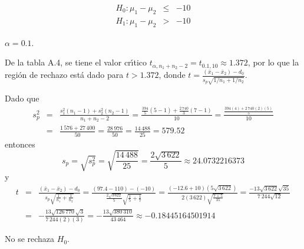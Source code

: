 \begin{solucion}
 \begin{hipotesis}
  \begin{eqnarray*}
   H_0: \mu_1 - \mu_2 & \leq & -10 \\
   H_1: \mu_1 - \mu_2 &   >  & -10
  \end{eqnarray*}
 \end{hipotesis}

 \begin{significancia}
  $\alpha = 0.1$.
 \end{significancia}

 \begin{region}
  De la tabla A.4, se tiene el valor cr\'{\i}tico
  $t_{\alpha, n_1+n_2-2} = t_{0.1,10} \approx 1.372$,
  por lo que la regi\'on de rechazo est\'a dado para $t > 1.372$,
  donde $t =
  \frac{
  \left( \bar{x}_1 - \bar{x}_2 \right) - d_0
  }{
  s_p\sqrt{1/n_1 + 1/n_2}
  }$.
 \end{region}

 \begin{estadistico}
  Dado que
  \begin{eqnarray*}
   s_p^2 & = & \frac{
   s_1^2 \left( n_1 - 1 \right) + s_2^2 \left( n_2 - 1\right)
   }{
   n_1 + n_2 -2
   }
   = \frac{\frac{394}{5}(5-1) + \frac{2\,740}{3}(7-1)}{10}
   = \frac{\frac{394(4) + 2\,740(2)(5)}{5}}{10} \\
   & = & \frac{1\,576 + 27\,400}{50} = \frac{28\,976}{50}
   = \frac{14\,488}{25} = 579.52
  \end{eqnarray*}
  entonces
  \begin{equation*}
   s_p = \sqrt{s_p^2} = \sqrt{\frac{14\,488}{25}}
   = \frac{2\sqrt{3\,622}}{5} \approx 24.0732216373
  \end{equation*}
  y
  \begin{eqnarray*}
   t & = & 
   \frac{
   \left( \bar{x}_1 - \bar{x}_2 \right) - d_0
   }{
   s_p\sqrt{\frac{1}{n_1} + \frac{1}{n_2}}
   }
   = \frac{
   (97.4 - 110) - (-10)
   }{
   \frac{2\sqrt{3\,622}}{5}\sqrt{\frac{1}{5} + \frac{1}{7}}
   }
   = \frac{
   (-12.6 + 10)\left(5\sqrt{3\,622}\right)
   }{
   2(3\,622)\sqrt{\frac{7+5}{35}}
   }
   = \frac{-13\sqrt{3\,622}\sqrt{35}}{7\,244\sqrt{12}} \\
   & = & -\frac{13\sqrt{126\,770}\sqrt{3}}{7\,244(2)(3)}
   = -\frac{13\sqrt{380\,310}}{43\,464}
   \approx -0.18445164501914
  \end{eqnarray*}
 \end{estadistico}

 \begin{decision}
  No se rechaza $H_0$.
 \end{decision}


\end{solucion}
